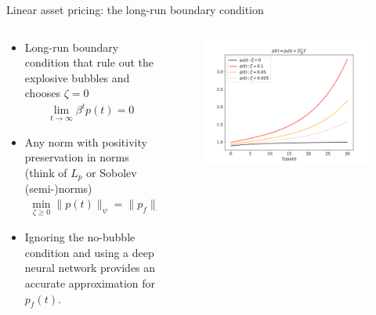 \documentclass[aspectratio=169,10pt]{beamer}
\begin{document}
\begin{frame}{Linear asset pricing: the long-run boundary condition}
	\begin{columns}
		\begin{column}{0.5\textwidth}
			\begin{itemize}
				\item Long-run boundary condition that rule out the explosive bubbles and chooses $\zeta =0$
				\begin{align*}
					\lim_{t\rightarrow \infty} \beta^t p(t) = 0
				\end{align*}
				\vspace{0.1in}
				\item Any norm with positivity preservation in norms (think of $L_p$ or Sobolev (semi-)norms)
				\begin{align*}
					\min_{\zeta\geq0} \|p(t)\|_\psi = \|p_f\|_\psi
				\end{align*}
				\item Ignoring the no-bubble condition and using a deep neural network provides an accurate approximation for $p_f(t)$.
			\end{itemize}
		\end{column}
		\begin{column}{0.5\textwidth}
			\begin{figure}[t!]
				\centering
				\includegraphics[width=\textwidth]{figs/bubble_solution.pdf}
				\vspace{-7mm}
			\end{figure}
		\end{column}
	\end{columns}
\end{frame}
\end{document}
